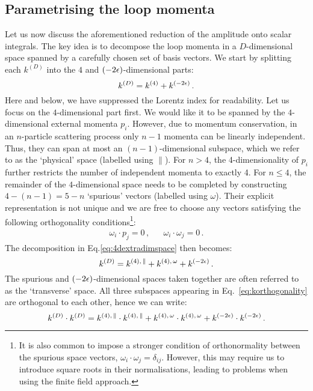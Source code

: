\documentclass[main.tex]{subfiles}
\begin{document}
\subsection{Parametrising the loop momenta}
Let us now discuss the aforementioned reduction of the amplitude onto scalar integrals. The key idea is to decompose the loop momenta in a $D$-dimensional space spanned by a carefully chosen set of basis vectors. We start by splitting each $k^{(D)}$ into the $4$ and $(-2\epsilon)$-dimensional parts:
\begin{equation} \label{eq:4dextradimspace}
    k^{(D)} = k^{(4)} + k^{(-2\epsilon)}\,.
\end{equation}
Here and below, we have suppressed the Lorentz index for readability. Let us focus on the $4$-dimensional part first. We would like it to be spanned by the $4$-dimensional external momenta $p_i$. However, due to momentum conservation, in an $n$-particle scattering process only $n-1$ momenta can be linearly independent. Thus, they can span at most an $(n-1)$-dimensional subspace, which we refer to as the `physical' space (labelled using $\parallel$). For $n>4$, the 4-dimensionality of $p_i$ further restricts the number of independent momenta to exactly 4. For $n\le4$, the remainder of the $4$-dimensional space needs to be completed by constructing $4-(n-1) = 5-n$ `spurious' vectors (labelled using $\omega$). Their explicit representation is not unique and we are free to choose any vectors satisfying the following orthogonality conditions\footnote{It is also common to impose a stronger condition of orthonormality between the spurious space vectors, $\omega_i \cdot \omega_j = \delta_{ij}$. However, this may require us to introduce square roots in their normalisations, leading to problems when using the finite field approach.}:
\begin{align} \label{eq:orthogonalityconditions}
    \omega_i \cdot p_j = 0\,, && \omega_i \cdot \omega_j = 0\,.
\end{align}
The decomposition in Eq.\ref{eq:4dextradimspace} then becomes:
\begin{equation} \label{eq:korthogonality}
    k^{(D)} = k^{(4),\, \parallel} + k^{(4),\, \omega} + k^{(-2\epsilon)}\,.
\end{equation}
The spurious and $(-2\epsilon)$-dimensional spaces taken together are often referred to as the `transverse' space. All three subspaces appearing in Eq.~\ref{eq:korthogonality} are orthogonal to each other, hence we can write:
\begin{equation} \label{eq:ksquared}
    k^{(D)} \cdot k^{(D)}  = k^{(4),\, \parallel} \cdot k^{(4),\, \parallel} + k^{(4),\, \omega} \cdot k^{(4),\, \omega} + k^{(-2\epsilon)} \cdot k^{(-2\epsilon)}\,.
\end{equation}
\end{document}
